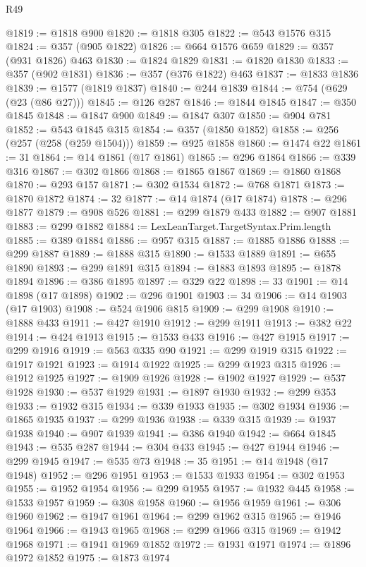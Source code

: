 \begin{lexlean}{R49}
\begin{coremodule}
@1819 := @1818 @900
@1820 := @1818 @305
@1822 := @543 @1576 @315
@1824 := @357 (@905 @1822)
@1826 := @664 @1576 @659
@1829 := @357 (@931 @1826) @463
@1830 := @1824 @1829
@1831 := @1820 @1830
@1833 := @357 (@902 @1831)
@1836 := @357 (@376 @1822) @463
@1837 := @1833 @1836
@1839 := @1577 (@1819 @1837)
@1840 := @244 @1839
@1844 := @754 (@629 (@23 (@86 @27)))
@1845 := @126 @287
@1846 := @1844 @1845
@1847 := @350 @1845
@1848 := @1847 @900
@1849 := @1847 @307
@1850 := @904 @781
@1852 := @543 @1845 @315
@1854 := @357 (@1850 @1852)
@1858 := @256 (@257 (@258 (@259 @1504)))
@1859 := @925 @1858
@1860 := @1474 @22
@1861 := 31
@1864 := @14 @1861 (@17 @1861)
@1865 := @296 @1864
@1866 := @339 @316
@1867 := @302 @1866
@1868 := @1865 @1867
@1869 := @1860 @1868
@1870 := @293 @157
@1871 := @302 @1534
@1872 := @768 @1871
@1873 := @1870 @1872
@1874 := 32
@1877 := @14 @1874 (@17 @1874)
@1878 := @296 @1877
@1879 := @908 @526
@1881 := @299 @1879 @433
@1882 := @907 @1881
@1883 := @299 @1882
@1884 := LexLeanTarget.TargetSyntax.Prim.length
@1885 := @389 @1884
@1886 := @957 @315
@1887 := @1885 @1886
@1888 := @299 @1887
@1889 := @1888 @315
@1890 := @1533 @1889
@1891 := @655 @1890
@1893 := @299 @1891 @315
@1894 := @1883 @1893
@1895 := @1878 @1894
@1896 := @386 @1895
@1897 := @329 @22
@1898 := 33
@1901 := @14 @1898 (@17 @1898)
@1902 := @296 @1901
@1903 := 34
@1906 := @14 @1903 (@17 @1903)
@1908 := @524 @1906 @815
@1909 := @299 @1908
@1910 := @1888 @433
@1911 := @427 @1910
@1912 := @299 @1911
@1913 := @382 @22
@1914 := @424 @1913
@1915 := @1533 @433
@1916 := @427 @1915
@1917 := @299 @1916
@1919 := @563 @335 @90
@1921 := @299 @1919 @315
@1922 := @1917 @1921
@1923 := @1914 @1922
@1925 := @299 @1923 @315
@1926 := @1912 @1925
@1927 := @1909 @1926
@1928 := @1902 @1927
@1929 := @537 @1928
@1930 := @537 @1929
@1931 := @1897 @1930
@1932 := @299 @353
@1933 := @1932 @315
@1934 := @339 @1933
@1935 := @302 @1934
@1936 := @1865 @1935
@1937 := @299 @1936
@1938 := @339 @315
@1939 := @1937 @1938
@1940 := @907 @1939
@1941 := @386 @1940
@1942 := @664 @1845
@1943 := @535 @287
@1944 := @304 @433
@1945 := @427 @1944
@1946 := @299 @1945
@1947 := @535 @73
@1948 := 35
@1951 := @14 @1948 (@17 @1948)
@1952 := @296 @1951
@1953 := @1533 @1933
@1954 := @302 @1953
@1955 := @1952 @1954
@1956 := @299 @1955
@1957 := @1932 @445
@1958 := @1533 @1957
@1959 := @308 @1958
@1960 := @1956 @1959
@1961 := @306 @1960
@1962 := @1947 @1961
@1964 := @299 @1962 @315
@1965 := @1946 @1964
@1966 := @1943 @1965
@1968 := @299 @1966 @315
@1969 := @1942 @1968
@1971 := @1941 @1969 @1852
@1972 := @1931 @1971
@1974 := @1896 @1972 @1852
@1975 := @1873 @1974

\end{coremodule}
\end{lexlean}
